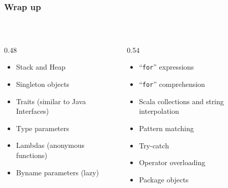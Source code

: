 \documentclass[aspectratio=169]{beamer}
\begin{document}
\begin{frame}\frametitle{Wrap up}
~\\[-8mm]
\begin{columns}
\begin{column}{0.48\textwidth}
\begin{itemize}
  \item Stack and Heap
  \item Singleton objects
  \item Traits (similar to Java Interfaces)
  \item Type parameters
  \item Lambdas (anonymous functions)
  \item Byname parameters (lazy)
\end{itemize}
\end{column}
\begin{column}{0.54\textwidth}
\begin{itemize}
  \item ``\texttt{for}'' expressions
  \item ``\texttt{for}'' comprehension
  \item Scala collections and string interpolation
  \item Pattern matching
  \item Try-catch
  \item Operator overloading
  \item Package objects
\end{itemize}
\end{column}
\end{columns}

    


\end{frame}
\end{document}
